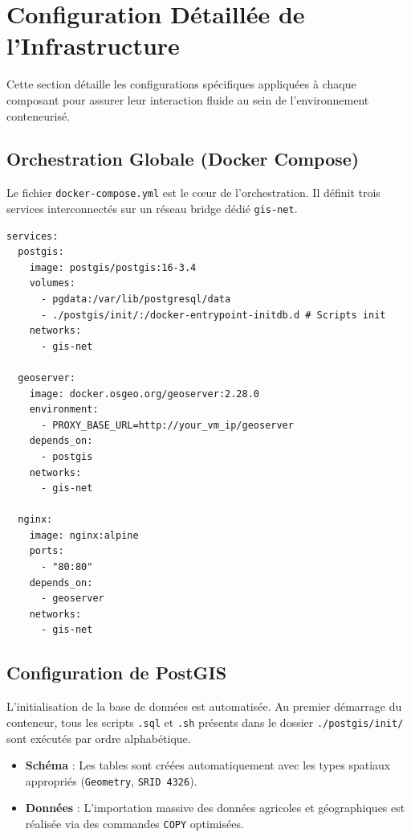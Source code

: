 \documentclass[11pt,a4paper]{article}
\begin{document}
\section{Configuration Détaillée de l'Infrastructure}

Cette section détaille les configurations spécifiques appliquées à chaque composant pour assurer leur interaction fluide au sein de l'environnement conteneurisé.

\subsection{Orchestration Globale (Docker Compose)}
Le fichier \texttt{docker-compose.yml} est le cœur de l'orchestration. Il définit trois services interconnectés sur un réseau bridge dédié \texttt{gis-net}.

\begin{tcolorbox}[colback=white, colframe=SlateGray, title=Extrait de la configuration Docker Compose]
\begin{verbatim}
services:
  postgis:
    image: postgis/postgis:16-3.4
    volumes:
      - pgdata:/var/lib/postgresql/data
      - ./postgis/init/:/docker-entrypoint-initdb.d # Scripts init
    networks:
      - gis-net

  geoserver:
    image: docker.osgeo.org/geoserver:2.28.0
    environment:
      - PROXY_BASE_URL=http://your_vm_ip/geoserver
    depends_on:
      - postgis
    networks:
      - gis-net

  nginx:
    image: nginx:alpine
    ports:
      - "80:80"
    depends_on:
      - geoserver
    networks:
      - gis-net
\end{verbatim}
\end{tcolorbox}

\subsection{Configuration de PostGIS}
L'initialisation de la base de données est automatisée. Au premier démarrage du conteneur, tous les scripts \texttt{.sql} et \texttt{.sh} présents dans le dossier \texttt{./postgis/init/} sont exécutés par ordre alphabétique.
\begin{itemize}
    \item \textbf{Schéma} : Les tables sont créées automatiquement avec les types spatiaux appropriés (\texttt{Geometry}, \texttt{SRID 4326}).
    \item \textbf{Données} : L'importation massive des données agricoles et géographiques est réalisée via des commandes \texttt{COPY} optimisées.
\end{itemize}
\end{document}

